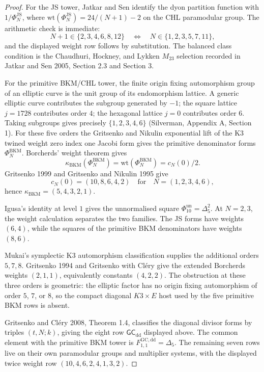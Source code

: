 \begin{proof}
For the JS tower, Jatkar and Sen identify the dyon partition function
with \(1/\Phi_N^{\mathrm{JS}}\), where
\(\mathrm{wt}(\Phi_N^{\mathrm{JS}})=24/(N+1)-2\) on the CHL
paramodular group. The arithmetic check is immediate:
\[
  N+1\in\{2,3,4,6,8,12\}
  \quad\Longleftrightarrow\quad
  N\in\{1,2,3,5,7,11\},
\]
and the displayed weight row follows by substitution. The balanced
class condition is the Chaudhuri, Hockney, and Lykken \(M_{23}\)
selection recorded in Jatkar and Sen 2005, Section 2.3 and Section 3.

For the primitive BKM/CHL tower, the finite origin fixing automorphism
group of an elliptic curve is the unit group of its endomorphism
lattice. A generic elliptic curve contributes the subgroup generated
by \(-1\); the square lattice \(j=1728\) contributes order \(4\); the
hexagonal lattice \(j=0\) contributes order \(6\). Taking subgroups
gives precisely \(\{1,2,3,4,6\}\) (Silverman, Appendix A, Section 1).
For these five orders the Gritsenko and Nikulin exponential lift of
the K3 twined weight zero index one Jacobi form gives the primitive
denominator forms \(\Phi_N^{\mathrm{BKM}}\). Borcherds' weight theorem
gives
\[
  \kappa_{\mathrm{BKM}}(\Phi_N^{\mathrm{BKM}})
  =\mathrm{wt}(\Phi_N^{\mathrm{BKM}})
  =c_N(0)/2.
\]
Gritsenko 1999 and Gritsenko and Nikulin 1995 give
\[
  c_N(0)=(10,8,6,4,2)
  \quad\text{for}\quad N=(1,2,3,4,6),
\]
hence \(\kappa_{\mathrm{BKM}}=(5,4,3,2,1)\).

Igusa's identity at level \(1\) gives the unnormalised square
\(\Phi_{10}^{\mathrm{un}}=\Delta_5^2\). At \(N=2,3\), the weight
calculation separates the two families. The JS forms have weights
\((6,4)\), while the squares of the primitive BKM denominators have
weights \((8,6)\).

Mukai's symplectic K3 automorphism classification supplies the
additional orders \(5,7,8\). Gritsenko 1994 and Gritsenko with
Cl\'ery give the extended Borcherds weights
\((2,1,1)\), equivalently constants \((4,2,2)\). The obstruction at
these three orders is geometric: the elliptic factor has no origin
fixing automorphism of order \(5\), \(7\), or \(8\), so the compact
diagonal \(K3\times E\) host used by the five primitive BKM rows is
absent.

Gritsenko and Cl\'ery 2008, Theorem 1.4, classifies the diagonal
divisor forms by triples \((t,N;k)\), giving the eight row
\(\mathsf{GC}_{\mathrm{dd}}\) displayed above. The common element with
the primitive BKM tower is \(F_{1,1}^{\mathrm{GC,dd}}=\Delta_5\).
The remaining seven rows live on their own paramodular groups and
multiplier systems, with the displayed twice weight row
\((10,4,6,2,4,1,3,2)\).
\end{proof}

